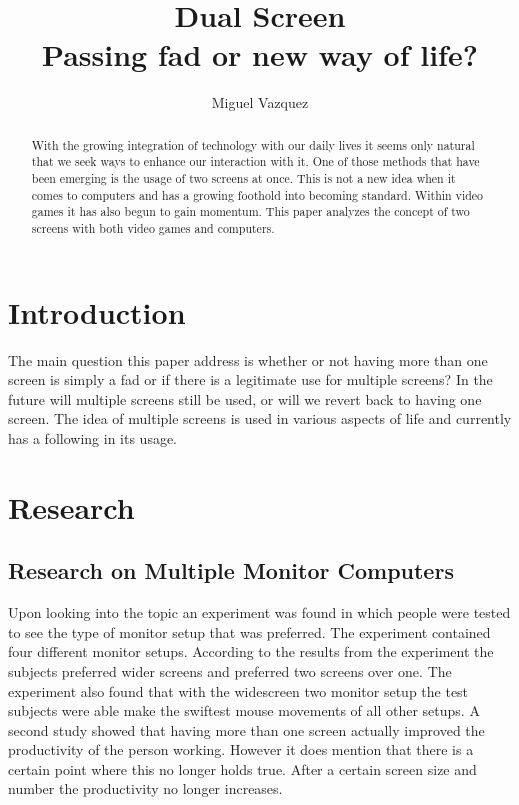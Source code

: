 \documentclass[11pt]{article}
\title{\textbf{Dual Screen} \\Passing fad or new way of life?}
\author{Miguel Vazquez}
\begin{document}
\maketitle
\begin{abstract}
With the growing integration of technology with our daily lives it seems only natural that we seek ways to enhance our interaction with it. One of those methods that have been emerging is the usage of two screens at once. This is not a new idea when it comes to computers and has a growing foothold into becoming standard. Within video games it has also begun to gain momentum. This paper analyzes the concept of two screens with both video games and computers.
\end{abstract}

\tableofcontents

\section{Introduction}
The main question this paper address is whether or not having more than one screen is simply a fad or if there is a legitimate use for multiple screens? In the future will multiple screens still be used, or will we revert back to having one screen. The idea of multiple screens is used in various aspects of life and currently has a following in its usage.


\section{Research}
\subsection{Research on Multiple Monitor Computers}
Upon looking into the topic an experiment was found\cite{monitors} in which people were tested to see the type of monitor setup that was preferred. The experiment contained four different monitor setups. According to the results from the experiment the subjects preferred wider screens and preferred two screens over one. The experiment also found that with the widescreen two monitor setup the test subjects were able make the swiftest mouse movements of all other setups. A second study \cite{monitors2} showed that having more than one screen actually improved the productivity of the person working. However it does mention that there is a certain point where this no longer holds true. After a certain screen size and number the productivity no longer increases.
\end{document}
